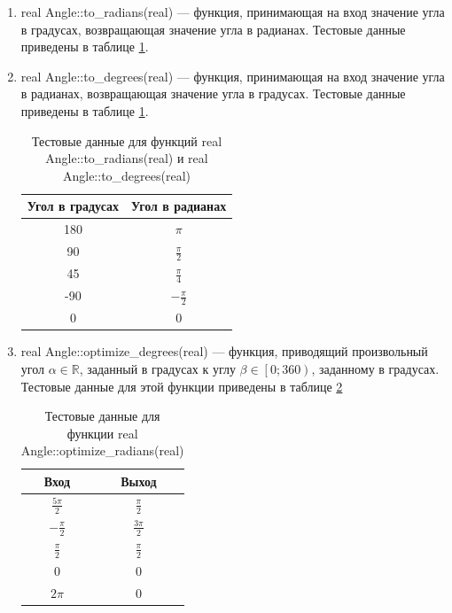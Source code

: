 \begin{enumerate}
	\item real Angle::to\_radians(real) --- функция, принимающая на вход значение угла в градусах, возвращающая значение угла в радианах. Тестовые данные приведены в таблице \ref{tbl:to_radians}.
	\item real Angle::to\_degrees(real) --- функция, принимающая на вход значение угла в радианах, возвращающая значение угла в градусах. Тестовые данные приведены в таблице \ref{tbl:to_radians}.
	\begin{table}
		\centering
		\caption{Тестовые данные для функций real Angle::to\_radians(real) и real Angle::to\_degrees(real)}
		\label{tbl:to_radians}
		\begin{tabular}{|c|c|}
			\hline
			Угол в градусах & Угол в радианах \\
			\hline
			180	& $\pi$	\\
			90	& $\frac{\pi}{2}$ \\
			45	& $\frac{\pi}{4}$ \\
			-90 & $-\frac{\pi}{2}$ \\
			0	& 0 \\
			\hline
		\end{tabular}
	\end{table}

	\item real Angle::optimize\_degrees(real) --- функция, приводящий произвольный угол $\alpha\in\mathbb{R}$, заданный в градусах к углу $\beta\in\left[0; 360\right)$, заданному в градусах. Тестовые данные для этой функции приведены в таблице \ref{tbl:optimize_radians}
	\begin{table}
		\centering
		\caption{Тестовые данные для функции real Angle::optimize\_radians(real)}
		\label{tbl:optimize_radians}
		\begin{tabular}{|c|c|}
			\hline
			Вход & Выход \\
			\hline
			$\frac{5\pi}{2}$ & $\frac{\pi}{2}$ \\
			$-\frac{\pi}{2}$ & $\frac{3\pi}{2}$	\\
			$\frac{\pi}{2}$ & $\frac{\pi}{2}$ \\
			$0$ & $0$ \\
			$2\pi$ & $0$ \\
			\hline
		\end{tabular}
	\end{table}


\end{enumerate}
